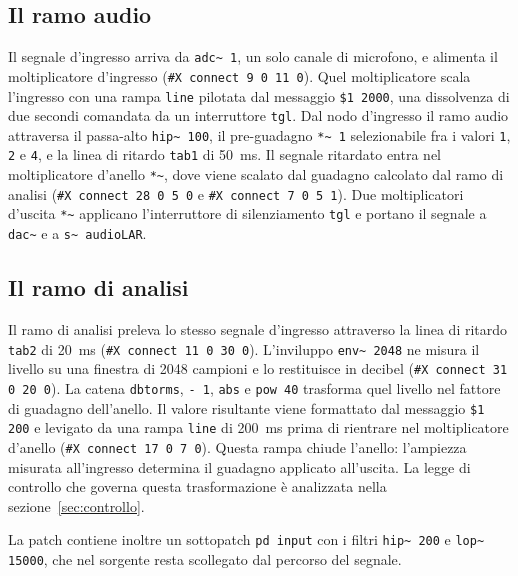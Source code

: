 \documentclass[11pt,a4paper]{article}
\begin{document}
\subsection{Il ramo audio}
Il segnale d'ingresso arriva da \texttt{adc\textasciitilde{} 1}, un solo canale di microfono, e alimenta il moltiplicatore d'ingresso (\texttt{\#X connect 9 0 11 0}).
Quel moltiplicatore scala l'ingresso con una rampa \texttt{line} pilotata dal messaggio \texttt{\$1 2000}, una dissolvenza di due secondi comandata da un interruttore \texttt{tgl}.
Dal nodo d'ingresso il ramo audio attraversa il passa-alto \texttt{hip\textasciitilde{} 100}, il pre-guadagno \texttt{*\textasciitilde{} 1} selezionabile fra i valori \texttt{1}, \texttt{2} e \texttt{4}, e la linea di ritardo \texttt{tab1} di \SI{50}{\milli\second}.
Il segnale ritardato entra nel moltiplicatore d'anello \texttt{*\textasciitilde{}}, dove viene scalato dal guadagno calcolato dal ramo di analisi (\texttt{\#X connect 28 0 5 0} e \texttt{\#X connect 7 0 5 1}).
Due moltiplicatori d'uscita \texttt{*\textasciitilde{}} applicano l'interruttore di silenziamento \texttt{tgl} e portano il segnale a \texttt{dac\textasciitilde{}} e a \texttt{s\textasciitilde{} audioLAR}.

\subsection{Il ramo di analisi}
Il ramo di analisi preleva lo stesso segnale d'ingresso attraverso la linea di ritardo \texttt{tab2} di \SI{20}{\milli\second} (\texttt{\#X connect 11 0 30 0}).
L'inviluppo \texttt{env\textasciitilde{} 2048} ne misura il livello su una finestra di 2048 campioni e lo restituisce in decibel (\texttt{\#X connect 31 0 20 0}).
La catena \texttt{dbtorms}, \texttt{- 1}, \texttt{abs} e \texttt{pow 40} trasforma quel livello nel fattore di guadagno dell'anello.
Il valore risultante viene formattato dal messaggio \texttt{\$1 200} e levigato da una rampa \texttt{line} di \SI{200}{\milli\second} prima di rientrare nel moltiplicatore d'anello (\texttt{\#X connect 17 0 7 0}).
Questa rampa chiude l'anello: l'ampiezza misurata all'ingresso determina il guadagno applicato all'uscita.
La legge di controllo che governa questa trasformazione è analizzata nella sezione~\ref{sec:controllo}.

La patch contiene inoltre un sottopatch \texttt{pd input} con i filtri \texttt{hip\textasciitilde{} 200} e \texttt{lop\textasciitilde{} 15000}, che nel sorgente resta scollegato dal percorso del segnale.
\end{document}
